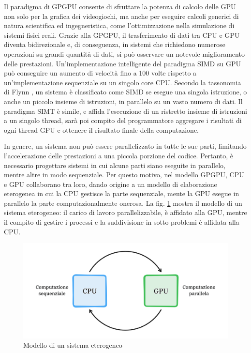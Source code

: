 Il paradigma di \gls{GPGPU} consente di sfruttare la potenza di calcolo delle \gls{GPU} non solo per la grafica dei videogiochi, ma anche per eseguire calcoli generici di natura scientifica ed ingegneristica, come l'ottimizzazione nella simulazione di sistemi fisici reali. Grazie alla \gls{GPGPU}, il trasferimento di dati tra \gls{CPU} e \gls{GPU} diventa bidirezionale e, di conseguenza, in sistemi che richiedono numerose operazioni su grandi quantità di dati, si può osservare un notevole miglioramento delle prestazioni. Un'implementazione intelligente del paradigma \gls{SIMD} su \gls{GPU} può conseguire un aumento di velocità fino a 100 volte rispetto a un'implementazione sequenziale su un singolo core \gls{CPU}. Secondo la tassonomia di Flynn \cite[]{Flynn:tax}, un sistema è classificato come \gls{SIMD} se esegue una singola istruzione, o anche un piccolo insieme di istruzioni, in parallelo su un vasto numero di dati. Il paradigma \gls{SIMT} è simile, e affida l'esecuzione di un ristretto insieme di istruzioni a un singolo thread, sarà poi compito del programmatore aggregare i risultati di ogni thread \gls{GPU} e ottenere il risultato finale della computazione.

In genere, un sistema non può essere parallelizzato in tutte le sue parti, limitando l'accelerazione delle prestazioni a una piccola porzione del codice. Pertanto, è necessario progettare sistemi in cui alcune parti siano eseguite in parallelo, mentre altre in modo sequenziale. Per questo motivo, nel modello \gls{GPGPU}, \gls{CPU} e \gls{GPU} collaborano tra loro, dando origine a un modello di elaborazione eterogenea in cui la \gls{CPU} gestisce la parte sequenziale, mente la \gls{GPU} esegue in parallelo la parte computazionalmente onerosa.
La fig. \ref{fig:het_model} mostra il modello di un sistema eterogeneo: il carico di lavoro parallelizzabile, è affidato alla \gls{GPU}, mentre il compito di gestire i processi e la suddivisione in sotto-problemi è affidata alla \gls{CPU}.

\begin{figure}[ht]
    \centering
    \includegraphics[width=.9\linewidth]{images/chapter2/het_model2.png}
    \caption{Modello di un sistema eterogeneo}
    \label{fig:het_model}
\end{figure}

